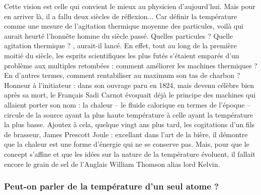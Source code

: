 Cette vision est celle qui convient le mieux au physicien d'aujourd'hui. Mais pour en arriver là, il a fallu deux siècles de réflexion... Car définir la température comme une mesure de l'agitation thermique moyenne des particules, voilà qui aurait heurté l'honnête homme du siècle passé. Quelles particules ? Quelle agitation thermique ? \textit{}, aurait-il lancé. En effet, tout au long de la première moitié du  siècle, les esprits scientifiques les plus futés s'étaient emparés d'un problème aux multiples retombées : comment améliorer les machines thermiques ? En d'autres termes, comment rentabiliser au maximum son tas de charbon ? Honneur à l'initiateur : dans son ouvrage paru en 1824, mais devenu célèbre bien après sa mort, le Français Sadi Carnot évoquait déjà le principe des machines qui allaient porter son nom : la chaleur -- le fluide calorique en termes de l'époque -- circule de la source ayant la plus haute température à celle ayant la température la plus basse. Ajoutez à cela, quelque vingt ans plus tard, les cogitations d'un fils de brasseur, James Prescott Joule : excellant dans l'art de la bière, il démontre que la chaleur est une forme d'énergie qui ne se conserve pas. Mais, pour que le concept s'affine et que les idées sur la nature de la température évoluent, il fallait encore le grain de sel de l'Anglais William Thomson alias lord Kelvin.

\subsubsection{Peut-on parler de la température d'un seul atome ?}

